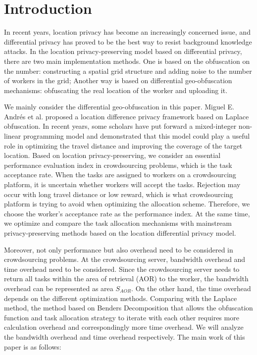 \section{Introduction} %
In recent years, location privacy has become an increasingly concerned issue, and differential privacy has proved to be the best way to resist background knowledge attacks. In the location privacy-preserving model based on differential privacy, there are two main implementation methods. One is based on the obfuscation on the number: constructing a spatial grid structure and adding noise to the number of workers in the grid; Another way is based on differential geo-obfuscation mechanisms: obfuscating the real location of the worker and uploading it.

We mainly consider the differential geo-obfuscation in this paper. Miguel E. Andrés et al. proposed a location difference privacy framework based on Laplace obfuscation. In recent years, some scholars have put forward a mixed-integer non-linear programming model and demonstrated that this model could play a useful role in optimizing the travel distance and improving the coverage of the target location.
Based on location privacy-preserving, we consider an essential performance evaluation index in crowdsourcing problems, which is the task acceptance rate. When the tasks are assigned to workers on a crowdsourcing platform, it is uncertain whether workers will accept the tasks. Rejection may occur with long travel distance or low reward, which is what crowdsourcing platform is trying to avoid when optimizing the allocation scheme. Therefore, we choose the worker's acceptance rate as the performance index. At the same time, we optimize and compare the task allocation mechanisms with mainstream privacy-preserving methods based on the location differential privacy model.

Moreover, not only performance but also overhead need to be considered in crowdsourcing problems. At the crowdsourcing server, bandwidth overhead and time overhead need to be considered. Since the crowdsourcing server needs to return all tasks within the area of retrieval (AOR) to the worker, the bandwidth overhead can be represented as area $S_{AOR}$. On the other hand, the time overhead depends on the different optimization methods. Comparing with the Laplace method, the method based on Benders Decomposition that allows the obfuscation function and task allocation strategy to iterate with each other requires more calculation overhead and correspondingly more time overhead. We will analyze the bandwidth overhead and time overhead respectively.
The main work of this paper is as follows:


